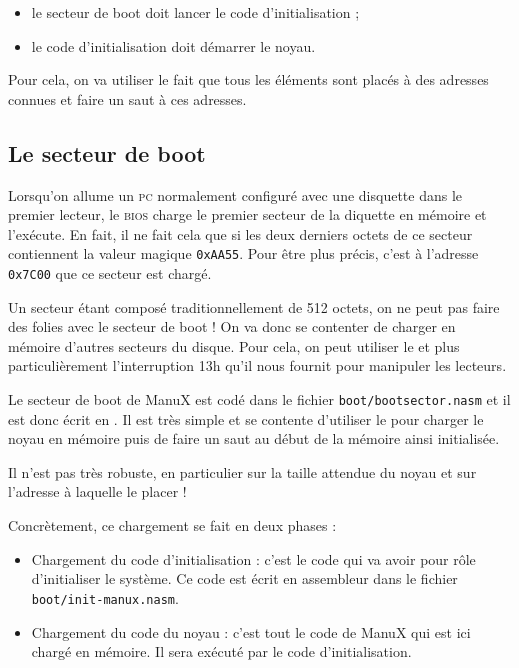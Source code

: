 \begin{itemize}
   \item le secteur de boot doit lancer le code d'initialisation ;
   \item le code d'initialisation doit démarrer le noyau.
\end{itemize}

   Pour cela, on va utiliser le fait que tous les éléments sont
placés à des adresses connues et faire un saut à ces adresses.
   
%
\subsection{Le secteur de boot}

   Lorsqu'on allume un \textsc{ pc} normalement configuré avec une disquette dans
le premier lecteur, le \textsc{ bios} charge le premier secteur de la diquette en
mémoire et l'exécute. En fait, il ne fait cela que si les deux derniers octets
de ce secteur contien\-nent la valeur magique {\tt 0xAA55}. Pour être
plus précis, c'est à l'adresse {\tt 0x7C00} que ce secteur est chargé.

   Un secteur étant composé traditionnellement de 512 octets, on ne
peut pas faire des folies avec le secteur de boot ! On va donc se
contenter de charger en mémoire d'autres secteurs du disque. Pour
cela, on peut utiliser le \bios et plus particulièrement
l'interruption 13h qu'il nous fournit pour manipuler les lecteurs.

   Le secteur de boot de ManuX est codé dans le fichier
\lstinline!boot/bootsector.nasm! et il est donc écrit en \nasm. Il est
très simple et se contente d'utiliser le \bios pour charger le
noyau en mémoire puis de faire un saut au début de la mémoire ainsi
initialisée.

   Il n'est pas très robuste, en particulier sur la taille attendue du
noyau et sur l'adresse à laquelle le placer !

   Concrètement, ce chargement se fait en deux phases :

\begin{itemize}
   \item Chargement du code d'initialisation : c'est le code qui va
     avoir pour rôle d'initialiser le système. Ce code est écrit en
     assembleur dans le fichier \lstinline!boot/init-manux.nasm!.
   \item Chargement du code du noyau : c'est tout le code de ManuX qui
     est ici chargé en mémoire. Il sera exécuté par le code
     d'initialisation. 
\end{itemize}

